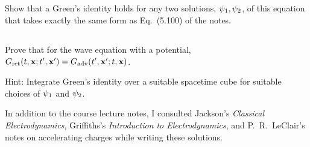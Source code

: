 \documentclass[11pt]{article}
\newenvironment{problem}
{
	\subsection{}
	\color{darkgray}
    \ignorespaces
}
{

}
\begin{document}
\begin{problem}
	Show that a Green's identity holds for any two solutions, $\psi_1, \psi_2$, of this equation that takes exactly the same form as Eq.~(5.100) of the notes.
\end{problem}

\begin{problem}
	Prove that for the wave equation with a potential, $G_{\text{ret}}(t, \vb{x}; t', \vb{x}') = G_{\text{adv}}(t', \vb{x}'; t, \vb{x})$.
	
	Hint: Integrate Green's identity over a suitable spacetime cube for suitable choices of $\psi_1$ and $\psi_2$.
\end{problem}



\vfill
In addition to the course lecture notes, I consulted Jackson's \emph{Classical Electrodynamics}, Griffiths's \emph{Introduction to Electrodynamics}, and P.~R.~LeClair's notes on accelerating charges while writing these solutions.
\end{document}
